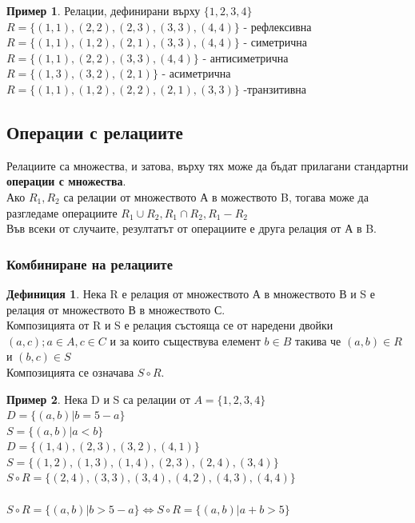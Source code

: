 \documentclass[fleqn, 12pt]{article}
\theoremstyle{definition}
\newtheorem{example}{Пример}[subsection]
\newtheorem{definition}{Дефиниция}[subsection]
\begin{document}
\begin{example}
Релации, дефинирани върху $\{1, 2, 3, 4 \}$ \\
$R = \{ (1, 1), (2, 2), (2, 3), (3, 3), (4, 4) \}$ - рефлексивна \\
$R = \{(1, 1), (1, 2), (2, 1), (3, 3), (4, 4) \}$  - симетрична \\
$R = \{(1, 1), (2, 2), (3, 3), (4, 4) \}$ - антисиметрична \\
$R = \{(1, 3), (3, 2), (2, 1) \}$ - асиметрична \\
$R = \{(1, 1), (1, 2), (2, 2), (2, 1), (3, 3)\}$ -транзитивна\\
\end{example}

\subsection{Операции с релациите}
Релациите са множества, и затова, върху тях може да бъдат прилагани стандартни \textbf{операции с множества}. \\
Ако $R_1, R_2$ са релации от множеството А в можеството B, тогава може да разгледаме операциите $R_1 \cup R_2, R_1 \cap R_2, R_1 - R_2$ \\
Във всеки от случаите, резултатът от операциите е друга релация от А в B. \\

\subsubsection{Комбиниране на релациите}

\begin{definition}
Нека R е релация от множеството А в множеството В и S е релация от множеството В в множеството С. \\
Композицията от R и S е релация състояща се от наредени двойки $(a,c); a \in A, c \in C$ и за които съществува елемент $ b \in B$ такива че $(a, b) \in R$ и $(b,c) \in S$ \\
Композицията се означава $S \circ R$.
\end{definition}

\begin{example}
Нека D и S са релации от $A = \{1, 2, 3, 4 \}$ \\
$D = \{ (a,b) | b = 5-a \}$ \\
$S = \{ (a,b) | a < b\}$\\
$D = \{(1, 4), (2, 3), (3, 2), (4, 1) \}$ \\
$S = \{ (1, 2), (1, 3), (1, 4), (2, 3), (2, 4), (3, 4) \}$\\
$S \circ R = \{ (2, 4), (3, 3), (3, 4), (4, 2), (4, 3), (4, 4) \}$\\
\\
$S \circ R =  \{ (a,b) | b > 5-a \} \Leftrightarrow S \circ R =  \{ (a,b) | a + b > 5 \}$
\end{example}
\end{document}
